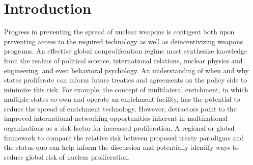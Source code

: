 \section{Introduction}
\label{s_motive}





Progress in preventing the spread of nuclear weapons is contigent both upon preventing access to the required technology as well as deincentivizing weapons programs. An effective global nonproliferation regime must synthesize knowledge from the realms of political science, international relations, nuclear physics and engineering, and even behavioral psychology. An understanding of when and why states proliferate can inform future treaties and agreements on the policy side to minimize this risk. For example, the concept of multilateral enrichment, in which multiple states co-own and operate an enrichment facility, has the potential to reduce the spread of enrichment technology. However, detractors point to the improved international networking opportunities inherent in multinational organizations as a risk factor for increased proliferation. A regional or global framework to compare the relative risk between proposed treaty paradigms and the status quo can help inform the discussion and potentially identify ways to reduce global risk of nuclear proliferation.

